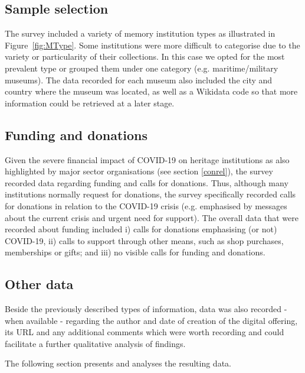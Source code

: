 \documentclass{egpubl}
\begin{document}
\subsection{Sample selection}
The survey included a variety of memory institution types as illustrated in Figure~\ref{fig:MType}. Some institutions were more difficult to categorise due to the variety or particularity of their collections. In this case we opted for the most prevalent type or grouped them under one category (e.g. maritime/military museums). The data recorded for each museum also included the city and country where the museum was located, as well as a Wikidata code so that more information could be retrieved at a later stage.

\subsection{Funding and donations}
\label{fund}
Given the severe financial impact of COVID-19 on heritage institutions as also highlighted by major sector organisations (see section \ref{conrel}), the survey recorded data regarding funding and calls for donations. Thus, although many institutions normally request for donations, the survey specifically recorded calls for donations in relation to the COVID-19 crisis (e.g. emphasised by messages about the current crisis and urgent need for support). The overall data that were recorded about funding included i) calls for donations emphasising (or not)  COVID-19, ii) calls to support through other means, such as shop purchases, memberships or gifts; and iii) no visible calls for funding and donations.

\subsection{Other data}
\label{other}

Beside the previously described types of information, data was also recorded - when available - regarding the author and date of creation of the digital offering, its URL and any additional comments which were worth recording and could facilitate a further qualitative analysis of findings.


The following section presents and analyses the resulting data. 
 
\end{document}

